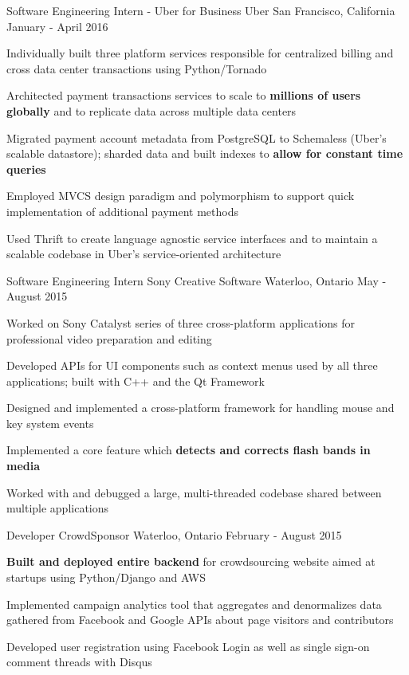 \begin{cventries}
  \cventry
    {Software Engineering Intern - Uber for Business}
    {Uber}
    {San Francisco, California}
    {January - April 2016}
    {
      \begin{cvitems}
      \item Individually built three platform services responsible for centralized billing and cross data center transactions using Python/Tornado
      \item Architected payment transactions services to scale to \textbf{millions of users globally} and to replicate data across multiple data centers
      \item Migrated payment account metadata from PostgreSQL to Schemaless (Uber's scalable datastore); sharded data and built indexes to \textbf{allow for constant time queries}
      \item Employed MVCS design paradigm and polymorphism to support quick implementation of additional payment methods
      \item Used Thrift to create language agnostic service interfaces and to maintain a scalable codebase in Uber's service-oriented architecture
      \end{cvitems}
    }
  \cventry
    {Software Engineering Intern}
    {Sony Creative Software}
    {Waterloo, Ontario}
    {May - August 2015}
    {
      \begin{cvitems}
        \item Worked on Sony Catalyst series of three cross-platform applications for professional video preparation and editing
        \item Developed APIs for UI components such as context menus used by all three applications; built with C++ and the Qt Framework
        \item Designed and implemented a cross-platform framework for handling mouse and key system events
        \item Implemented a core feature which \textbf{detects and corrects flash bands in media}
        \item Worked with and debugged a large, multi-threaded codebase shared between multiple applications
      \end{cvitems}
    }
  \cventry
    {Developer}
    {CrowdSponsor}
    {Waterloo, Ontario}
    {February - August 2015}
    {
      \begin{cvitems}
        \item \textbf{Built and deployed entire backend} for crowdsourcing website aimed at startups using Python/Django and AWS
        \item Implemented campaign analytics tool that aggregates and denormalizes data gathered from Facebook and Google APIs about page visitors and contributors
        \item Developed user registration using Facebook Login as well as single sign-on comment threads with Disqus
      \end{cvitems}
    }
\end{cventries}

